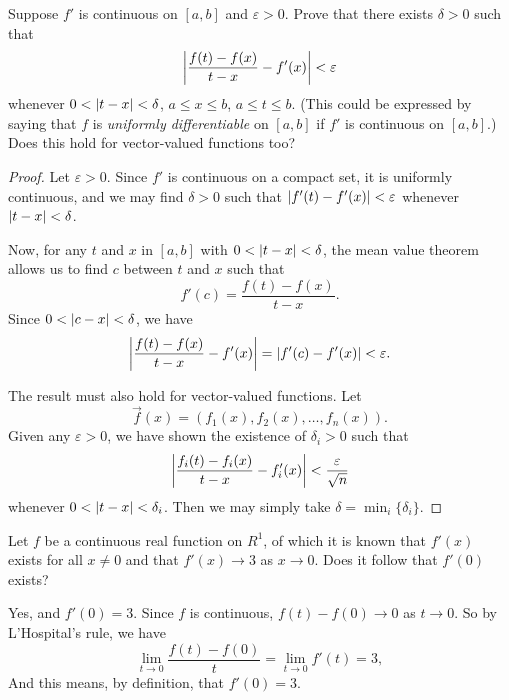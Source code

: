  Suppose $f'$ is continuous on $[a,b]$ and
$\varepsilon > 0$. Prove that there exists $\delta > 0$ such that
\begin{equation*}
  \left\lvert{\frac{f(t)-f(x)}{t-x} - f'(x)}\right\rvert < \varepsilon
\end{equation*}
whenever $0 < \lvert{t - x}\rvert < \delta$, $a\leq x\leq b$, $a\leq t\leq
b$. (This could be expressed by saying that $f$ is {\em uniformly
  differentiable} on $[a,b]$ if $f'$ is continuous on $[a,b]$.) Does
this hold for vector-valued functions too?
\begin{proof}
  Let $\varepsilon > 0$. Since $f'$ is continuous on a compact set, it
  is uniformly continuous, and we may find $\delta > 0$ such that
  $\lvert{f'(t) - f'(x)}\rvert < \varepsilon$ whenever $\lvert{t - x}\rvert < \delta$.

  Now, for any $t$ and $x$ in $[a,b]$ with $0 < \lvert{t - x}\rvert < \delta$,
  the mean value theorem allows us to find $c$ between $t$ and $x$
  such that
  \begin{equation*}
    f'(c) = \frac{f(t) - f(x)}{t - x}.
  \end{equation*}
  Since $0 < \lvert{c - x}\rvert < \delta$, we have
  \begin{equation*}
    \left\lvert{\frac{f(t) - f(x)}{t-x} - f'(x)}\right\rvert
    = \lvert{f'(c) - f'(x)}\rvert < \varepsilon.
  \end{equation*}

  The result must also hold for vector-valued functions. Let
  \begin{equation*}
    \vec{f}(x) = (f_1(x), f_2(x), \dots, f_n(x)).
  \end{equation*}
  Given any $\varepsilon > 0$, we have shown the existence of
  $\delta_i > 0$ such that
  \begin{equation*}
    \left\lvert{\frac{f_i(t) - f_i(x)}{t - x} - f_i'(x)}\right\rvert
    < \frac{\varepsilon}{\sqrt{n}}
  \end{equation*}
  whenever $0 < \lvert{t - x}\rvert < \delta_i$. Then we may simply take
  $\delta = \min_i\{\delta_i\}$.
\end{proof}

 Let $f$ be a continuous real function on $R^1$, of which it
is known that $f'(x)$ exists for all $x\neq0$ and that $f'(x)\to3$ as
$x\to0$. Does it follow that $f'(0)$ exists?
\begin{solution}
  Yes, and $f'(0) = 3$. Since $f$ is continuous, $f(t) - f(0)\to0$ as
  $t\to0$. So by L'Hospital's rule, we have
  \begin{equation*}
    \lim_{t\to 0}\frac{f(t) - f(0)}t
    = \lim_{t\to 0}f'(t) = 3,
  \end{equation*}
  And this means, by definition, that $f'(0) = 3$.
\end{solution}

